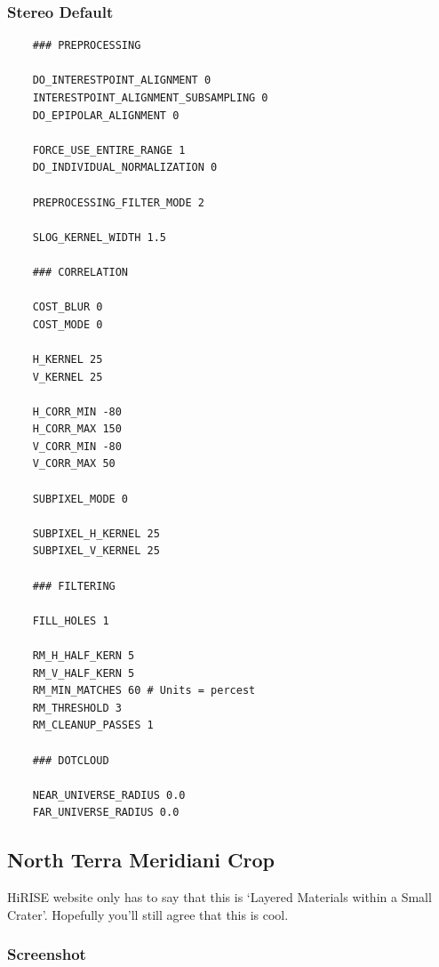 \subsubsection*{Stereo Default}

\begin{verbatim}
    ### PREPROCESSING

    DO_INTERESTPOINT_ALIGNMENT 0
    INTERESTPOINT_ALIGNMENT_SUBSAMPLING 0
    DO_EPIPOLAR_ALIGNMENT 0

    FORCE_USE_ENTIRE_RANGE 1
    DO_INDIVIDUAL_NORMALIZATION 0

    PREPROCESSING_FILTER_MODE 2

    SLOG_KERNEL_WIDTH 1.5

    ### CORRELATION

    COST_BLUR 0
    COST_MODE 0

    H_KERNEL 25
    V_KERNEL 25

    H_CORR_MIN -80
    H_CORR_MAX 150
    V_CORR_MIN -80
    V_CORR_MAX 50

    SUBPIXEL_MODE 0

    SUBPIXEL_H_KERNEL 25
    SUBPIXEL_V_KERNEL 25

    ### FILTERING

    FILL_HOLES 1

    RM_H_HALF_KERN 5
    RM_V_HALF_KERN 5
    RM_MIN_MATCHES 60 # Units = percest
    RM_THRESHOLD 3
    RM_CLEANUP_PASSES 1

    ### DOTCLOUD

    NEAR_UNIVERSE_RADIUS 0.0
    FAR_UNIVERSE_RADIUS 0.0
\end{verbatim}

\subsection{North Terra Meridiani Crop}

HiRISE website only has to say that this is `Layered Materials within
a Small Crater'. Hopefully you'll still agree that this is cool.

\subsubsection*{Screenshot}

